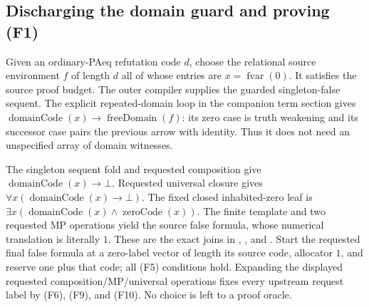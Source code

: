 \subsection{Discharging the domain guard and proving (F1)}

Given an ordinary-PAeq refutation code $d$, choose the relational
source environment $f$ of length $d$ all of whose entries are
$x=\operatorname{fvar}(0)$.  It satisfies the source proof budget.
The outer compiler supplies the guarded singleton-false sequent.
The explicit repeated-domain loop in the companion term section
gives
$\operatorname{domainCode}(x)\to\operatorname{freeDomain}(f)$:
its zero case is truth weakening and its successor case pairs the
previous arrow with identity.  Thus it does not need an unspecified
array of domain witnesses.

The singleton sequent fold and requested composition give
$\operatorname{domainCode}(x)\to\bot$.
Requested universal closure gives
$\forall x(\operatorname{domainCode}(x)\to\bot)$.
The fixed closed inhabited-zero leaf is
$\exists x(\operatorname{domainCode}(x)\land\operatorname{zeroCode}(x))$.
The finite  template and two requested
MP operations yield the source false formula, whose numerical
translation is literally $1$.
These are the exact joins in
,
, and
.
Start the requested final false formula at a zero-label vector of
length its source code, allocator $1$, and reserve one plus that
code; all (F5) conditions hold.  Expanding the displayed requested
composition/MP/universal operations fixes every upstream request
label by (F6), (F9), and (F10).  No choice is left to a proof oracle.

